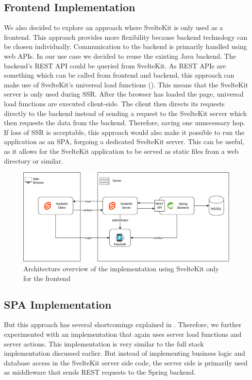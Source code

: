 \subsection{Frontend Implementation}
We also decided to explore an approach where SvelteKit is only used as a frontend. This approach provides more flexibility because backend technology can be chosen individually. Communication to the backend is primarily handled using web APIs. In our use case we decided to reuse the existing Java backend. The backend's REST API could be queried from SvelteKit. As REST APIs are something which can be called from frontend and backend, this approach can make use of SvelteKit's universal load functions (). This means that the SvelteKit server is only used during SSR. After the browser has loaded the page, universal load functions are executed client-side. The client then directs its requests directly to the backend instead of sending a request to the SvelteKit server which then requests the data from the backend. Therefore, saving one unnecessary hop. If loss of SSR is acceptable, this approach would also make it possible to run the application as an SPA, forgoing a dedicated SvelteKit server. This can be useful, as it allows for the SvelteKit application to be served as static files from a web directory or similar.

\begin{figure}[ht]
    \centering
    \includegraphics[width=.9\linewidth]{assets/dswfd-architecture-frontend}
    \caption{Architecture overview of the implementation using SvelteKit only for the frontend}
    \label{fig:dswfd-architecture-fe-only}
\end{figure}

\subsection{SPA Implementation}
\label{sec:implementation-redirect}
But this approach has several shortcomings explained in . Therefore, we further experimented with an implementation that again uses server load functions and server actions. This implementation is very similar to the full stack implementation discussed earlier. But instead of implementing business logic and database access in the SvelteKit server side code, the server side is primarily used as middleware that sends REST requests to the Spring backend.

